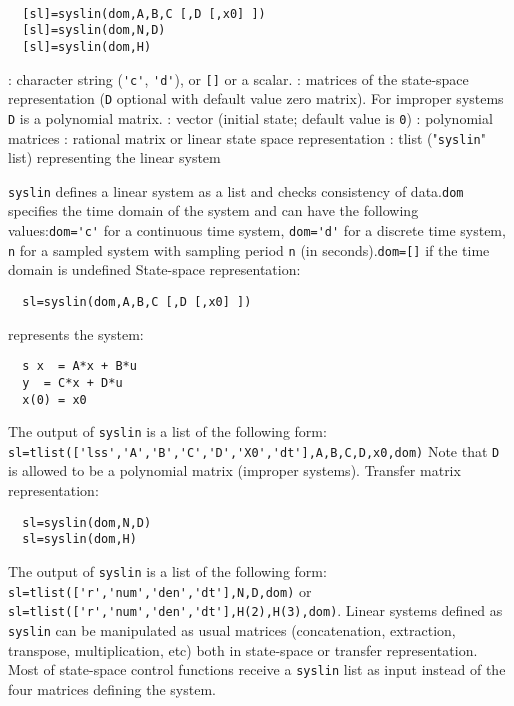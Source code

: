 \begin{mandesc}
   \\ %
\end{mandesc}
\begin{calling_sequence}
\begin{verbatim}
  [sl]=syslin(dom,A,B,C [,D [,x0] ])  
  [sl]=syslin(dom,N,D)  
  [sl]=syslin(dom,H)  
\end{verbatim}
\end{calling_sequence}
\begin{parameters}
  \begin{varlist}
    : character string (\verb!'c'!, \verb!'d'!), or \verb![]! or a scalar.
    : matrices of the state-space representation (\verb!D! optional with default value zero matrix). 
    For improper systems \verb!D! is a polynomial matrix.
    : vector (initial state; default value is \verb!0!)
    : polynomial matrices
    : rational matrix or linear state space representation
    : tlist ("\verb!syslin!" list) representing the linear system
  \end{varlist}
\end{parameters}
\begin{mandescription}
  \verb!syslin!  defines a linear system as a list and checks consistency of
  data.\verb!dom! specifies the time domain of the system and can have the
  following values:\verb!dom='c'! for a continuous time system, \verb!dom='d'!
  for a discrete time system, \verb!n! for a sampled system with sampling period
  \verb!n! (in seconds).\verb!dom=[]! if the time domain is undefined
  State-space representation:
\begin{verbatim}
  sl=syslin(dom,A,B,C [,D [,x0] ])
\end{verbatim}
represents the system:
\begin{verbatim}
  s x  = A*x + B*u
  y  = C*x + D*u
  x(0) = x0
\end{verbatim}
The output of \verb!syslin! is a list of the following form: 
\verb!sl=tlist(['lss','A','B','C','D','X0','dt'],A,B,C,D,x0,dom)!
Note that \verb!D! is allowed to be a polynomial matrix (improper systems).
Transfer matrix representation:
\begin{verbatim}
  sl=syslin(dom,N,D) 
  sl=syslin(dom,H)
\end{verbatim}
The output of \verb!syslin! is a list of the following form:  
\verb!sl=tlist(['r','num','den','dt'],N,D,dom)! or \verb!sl=tlist(['r','num','den','dt'],H(2),H(3),dom)!.
Linear systems defined as \verb!syslin! can be manipulated as
usual matrices (concatenation, extraction, transpose, multiplication, etc)
both in state-space or transfer representation.
Most of state-space control functions receive a \verb!syslin! list as input instead
of the four matrices defining the system.
\end{mandescription}
